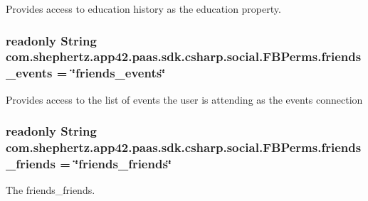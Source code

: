 Provides access to education history as the education property. 

\hypertarget{classcom_1_1shephertz_1_1app42_1_1paas_1_1sdk_1_1csharp_1_1social_1_1_f_b_perms_aa0d59d1b7a97df12abd9f637dc130ebe}{
\subsubsection[{friends\+\_\+events}]{\setlength{\rightskip}{0pt plus 5cm}readonly String com.\+shephertz.\+app42.\+paas.\+sdk.\+csharp.\+social.\+F\+B\+Perms.\+friends\+\_\+events = \char`\"{}friends\+\_\+events\char`\"{}\hspace{0.3cm}{\ttfamily [static]}}}\label{classcom_1_1shephertz_1_1app42_1_1paas_1_1sdk_1_1csharp_1_1social_1_1_f_b_perms_aa0d59d1b7a97df12abd9f637dc130ebe}


Provides access to the list of events the user is attending as the events connection 

\hypertarget{classcom_1_1shephertz_1_1app42_1_1paas_1_1sdk_1_1csharp_1_1social_1_1_f_b_perms_a9b92fd270d38dbcf66b85778f2550103}{
\subsubsection[{friends\+\_\+friends}]{\setlength{\rightskip}{0pt plus 5cm}readonly String com.\+shephertz.\+app42.\+paas.\+sdk.\+csharp.\+social.\+F\+B\+Perms.\+friends\+\_\+friends = \char`\"{}friends\+\_\+friends\char`\"{}\hspace{0.3cm}{\ttfamily [static]}}}\label{classcom_1_1shephertz_1_1app42_1_1paas_1_1sdk_1_1csharp_1_1social_1_1_f_b_perms_a9b92fd270d38dbcf66b85778f2550103}


The friends\+\_\+friends. 

